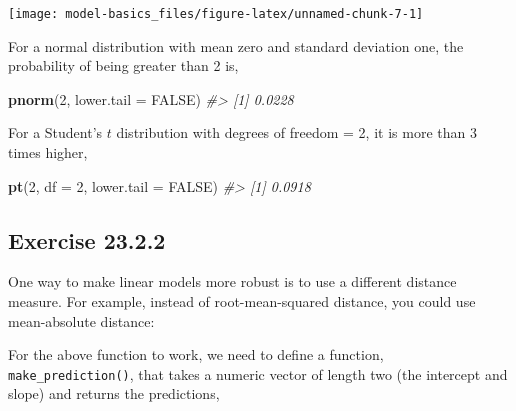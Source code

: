 \documentclass[]{book}
\newenvironment{Shaded}{\begin{snugshade}}{\end{snugshade}}
\newcommand{\CommentTok}[1]{\textcolor[rgb]{0.56,0.35,0.01}{\textit{#1}}}
\newcommand{\ControlFlowTok}[1]{\textcolor[rgb]{0.13,0.29,0.53}{\textbf{#1}}}
\newcommand{\DataTypeTok}[1]{\textcolor[rgb]{0.13,0.29,0.53}{#1}}
\newcommand{\DecValTok}[1]{\textcolor[rgb]{0.00,0.00,0.81}{#1}}
\newcommand{\KeywordTok}[1]{\textcolor[rgb]{0.13,0.29,0.53}{\textbf{#1}}}
\newcommand{\NormalTok}[1]{#1}
\newcommand{\OperatorTok}[1]{\textcolor[rgb]{0.81,0.36,0.00}{\textbf{#1}}}
\newcommand{\OtherTok}[1]{\textcolor[rgb]{0.56,0.35,0.01}{#1}}
\newcommand{\StringTok}[1]{\textcolor[rgb]{0.31,0.60,0.02}{#1}}
\theoremstyle{plain}
\theoremstyle{remark}
\theoremstyle{definition}
\theoremstyle{definition}
\theoremstyle{definition}
\theoremstyle{remark}
\begin{document}
\begin{center}\texttt{[image: model-basics\_files/figure-latex/unnamed-chunk-7-1]} \end{center}

For a normal distribution with mean zero and standard deviation one, the
probability of being greater than 2 is,

\begin{Shaded}
\begin{Highlighting}[]
\KeywordTok{pnorm}\NormalTok{(}\DecValTok{2}\NormalTok{, }\DataTypeTok{lower.tail =} \OtherTok{FALSE}\NormalTok{)}
\CommentTok{#> [1] 0.0228}
\end{Highlighting}
\end{Shaded}

For a Student's \(t\) distribution with degrees of freedom = 2, it is
more than 3 times higher,

\begin{Shaded}
\begin{Highlighting}[]
\KeywordTok{pt}\NormalTok{(}\DecValTok{2}\NormalTok{, }\DataTypeTok{df =} \DecValTok{2}\NormalTok{, }\DataTypeTok{lower.tail =} \OtherTok{FALSE}\NormalTok{)}
\CommentTok{#> [1] 0.0918}
\end{Highlighting}
\end{Shaded}

\hypertarget{exercise-23.2.2}{%
\subsection*{\texorpdfstring{Exercise
{23.2.2}}{Exercise 23.2.2}}\label{exercise-23.2.2}}

One way to make linear models more robust is to use a different distance
measure. For example, instead of root-mean-squared distance, you could
use mean-absolute distance:

\begin{Shaded}
\end{Shaded}

For the above function to work, we need to define a function,
\texttt{make\_prediction()}, that takes a numeric vector of length two
(the intercept and slope) and returns the predictions,
\end{document}
